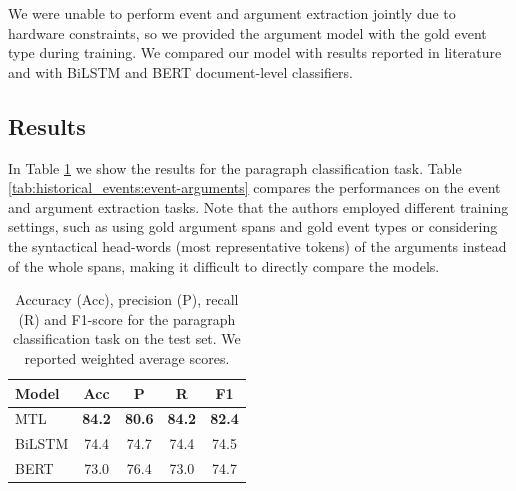 \documentclass[runningheads]{llncs}
\begin{document}
We were unable to perform event and argument extraction jointly due to hardware constraints, so we provided the argument model with the gold event type during training. We compared our model with results reported in literature and with BiLSTM and BERT document-level classifiers.

\subsection{Results}

In Table \ref{tab:historical_events:classification} we show the results for the paragraph classification task. Table \ref{tab:historical_events:event-arguments} compares the performances on the event and argument extraction tasks. Note that the authors employed different training settings, such as using gold argument spans and gold event types or considering the syntactical head-words (most representative tokens) of the arguments instead of the whole spans, making it difficult to directly compare the models.

\vspace*{-3mm}

\begin{table}
    \caption{Accuracy (Acc), precision (P), recall (R) and F1-score for the paragraph classification task on the test set. We reported weighted average scores.}
    \label{tab:historical_events:classification}
    \centering
    \begin{tabular}{lcccc}
        \toprule
        Model & Acc & P & R & F1\\
        \midrule
        MTL & \textbf{84.2} & \textbf{80.6} & \textbf{84.2} & \textbf{82.4} \\
        BiLSTM & 74.4 & 74.7 & 74.4 & 74.5 \\
        BERT & 73.0 & 76.4 & 73.0 & 74.7 \\
        \bottomrule
    \end{tabular}
\end{table}

\vspace*{-10mm}
\end{document}
